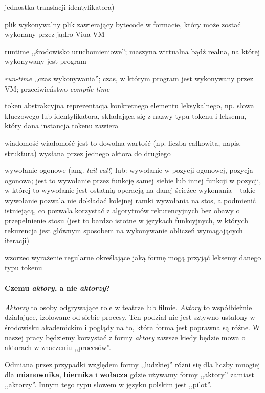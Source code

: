 \begin{labeling}{jednostka translacji}
        identyfikatora)
    \item[plik wykonywalny] plik zawierający bytecode w formacie, który może zostać wykonany przez jądro Viua
        VM
    \item[runtime] ,,środowisko uruchomieniowe''; maszyna wirtualna bądź realna, na której
        wykonywany jest program
    \item[\emph{run-time}] ,,czas wykonywania''; czas, w którym program jest wykonywany przez VM;
        przeciwieństwo \emph{compile-time}
    \item[token] abstrakcyjna reprezentacja konkretnego elementu leksykalnego, np. słowa kluczowego lub
        identyfikatora, składająca się z nazwy typu tokenu i leksemu, który dana instancja tokenu zawiera
	\item[wiadomość] wiadomość jest to dowolna wartość (np. liczba całkowita,
		napis, struktura) wysłana przez jednego aktora do drugiego
    \item[wywołanie ogonowe] (ang. \emph{tail call}) lub: wywołanie w pozycji
        ogonowej, pozycja ogonowa; jest to wywołanie przez funkcję samej siebie
        lub innej funkcji w pozycji, w której to wywołanie jest ostatnią
        operacją na danej ścieżce wykonania -- takie wywołanie pozwala nie
        dokładać kolejnej ramki wywołania na stos, a podmienić istniejącą, co
        pozwala korzystać z algorytmów rekurencyjnych bez obawy o przepełnienie
        stosu (jest to bardzo istotne w językach funkcyjnych, w których
        rekurencja jest głównym sposobem na wykonywanie obliczeń wymagających
        iteracji)
    \item[wzorzec] wyrażenie regularne określające jaką formę mogą przyjąć leksemy danego typu tokenu
\end{labeling}

\paragraph*{Czemu \emph{aktory}, a nie \emph{aktorzy}?}
\label{glossary_actors}

\emph{Aktorzy} to osoby odgrywające role w teatrze lub filmie. \emph{Aktory} to
współbieżnie działające, izolowane od siebie procesy. Ten podział nie jest
sztywno ustalony w środowisku akademickim i poglądy na to, która forma jest
poprawna są różne. W naszej pracy będziemy korzystać z formy \emph{aktory}
zawsze kiedy będzie mowa o aktorach w znaczeniu ,,procesów''.

Odmiana przez przypadki względem formy ,,ludzkiej'' różni się dla liczby mnogiej
dla \textbf{mianownika}, \textbf{biernika} i \textbf{wołacza} gdzie używamy
formy ,,aktory'' zamiast ,,aktorzy''. Innym tego typu słowem w języku polskim
jest ,,pilot''.

